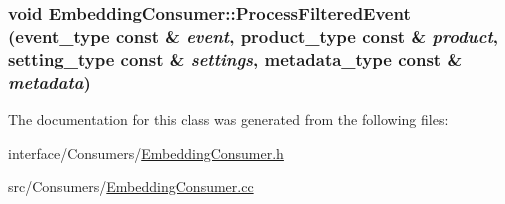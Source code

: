 \label{classEmbeddingConsumer_a47494820d0e08242f08c6b8afa7c347f}
\hypertarget{classEmbeddingConsumer_afb8e7cec39d5722d4cd30e56e8cae6fc}{
\subsubsection[{ProcessFilteredEvent}]{\setlength{\rightskip}{0pt plus 5cm}void EmbeddingConsumer::ProcessFilteredEvent (event\_\-type const \& {\em event}, \/  product\_\-type const \& {\em product}, \/  setting\_\-type const \& {\em settings}, \/  metadata\_\-type const \& {\em metadata})}}
\label{classEmbeddingConsumer_afb8e7cec39d5722d4cd30e56e8cae6fc}


The documentation for this class was generated from the following files:\begin{DoxyCompactItemize}
\item 
interface/Consumers/\hyperlink{EmbeddingConsumer_8h}{EmbeddingConsumer.h}\item 
src/Consumers/\hyperlink{EmbeddingConsumer_8cc}{EmbeddingConsumer.cc}\end{DoxyCompactItemize}
